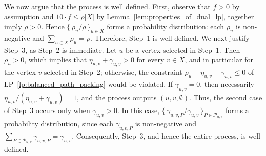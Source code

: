 We now argue that the process is well defined.
% 
First, observe that $f > 0$ by assumption and $10\cdot f \leq \rho |X|$ by Lemma~\ref{lem:properties_of_dual_lp}, together imply $\rho > 0$. Hence $\{\, \rho_u / \rho \,\}_{u \in X}$ forms a probability distribution: each $\rho_u$ is non-negative and $\sum_{u \in X} \rho_u = \rho$. Therefore, Step~1 is well defined.
% 
We next justify Step~3, as Step~2 is immediate.
% 
Let $u$ be a vertex selected in Step~1. Then $\rho_u > 0$, which implies that $\eta_{u,v} + \gamma_{u,v} > 0$ for every $v \in X$, and in particular for the vertex $v$ selected in Step~2; otherwise, the constraint $\rho_u - \eta_{u,v} - \gamma_{u,v} \leq 0$ of LP~\ref{lp:balanced_path_packing} would be violated. If $\gamma_{u,v} = 0$, then necessarily $\eta_{u,v} / (\eta_{u,v} + \gamma_{u,v}) = 1$, and the process outputs $(u,v,\emptyset)$. Thus, the second case of Step~3 occurs only when $\gamma_{u,v} > 0$. In this case, $\{\, \gamma_{u,v,P} / \gamma_{u,v} \,\}_{P \in \mathcal{P}_{u,v}}$ forms a probability distribution, since each $\gamma_{u,v,P}$ is non-negative and $\sum_{P \in \mathcal{P}_{u,v}} \gamma_{u,v,P} = \gamma_{u,v}$.
% 
Consequently, Step~3, and hence the entire process, is well defined.




